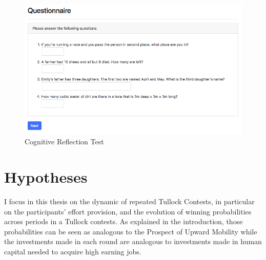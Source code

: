     \begin{figure}
        \centering
        \includegraphics[width=\textwidth]{graphs/CRT_Quest.png}
        \caption{Cognitive Reflection Test \citep{thomson2016}}
        \label{fig:crt_quest}
    \end{figure}
    
    \section{Hypotheses}\label{sec:hyp}
    
        
    


    
    
    I focus in this thesis on the dynamic of repeated Tullock Contests, in particular on the participants' effort provision, and the evolution of winning probabilities across periods in a Tullock contests. As explained in the introduction, those probabilities can be seen as analogous to the Prospect of Upward Mobility while the investments made in each round are analogous to investments made in human capital needed to acquire high earning jobs.\\
    
